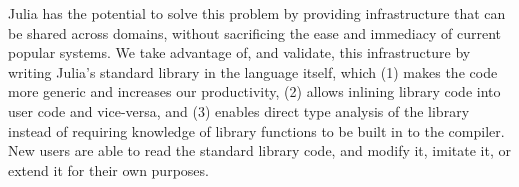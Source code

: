 \documentclass[9pt]{sigplanconf}
\begin{document}

Julia has the potential to solve this problem by providing infrastructure
that can be shared across domains, without sacrificing the ease and
immediacy of current popular systems. We take advantage of, and validate,
this infrastructure by writing Julia's standard library in the language
itself, which (1) makes the code more generic and increases our
productivity, (2) allows inlining library code into user code and
vice-versa, and (3) enables direct type analysis of the library instead of
requiring knowledge of library functions to be built in to the compiler.
New users are able to read the standard library code, and modify it,
imitate it, or extend it for their own purposes.







\end{document}
